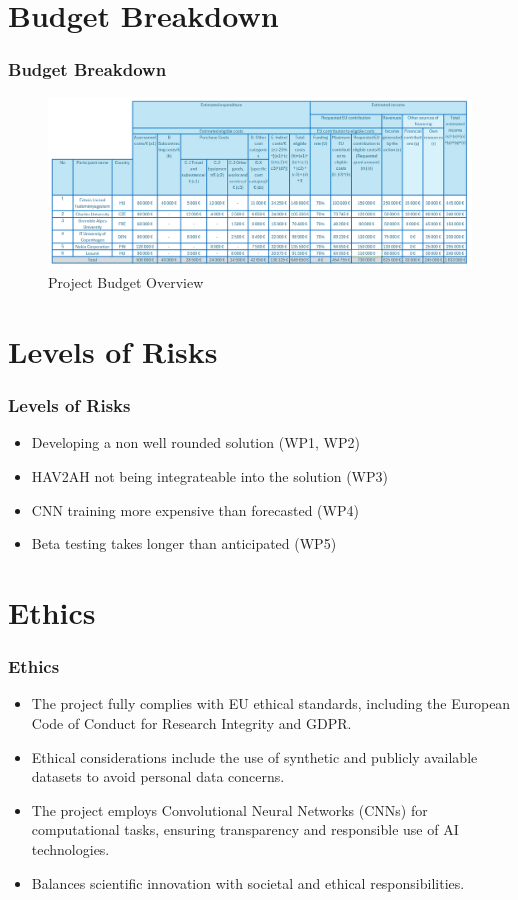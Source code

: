 \documentclass{beamer}
\begin{document}
\section{Budget Breakdown}
\begin{frame}
\frametitle{Budget Breakdown}

\begin{figure}[htbp]
    \centering
    \includegraphics[width=1\textwidth]{images/budget.png}
    \caption{Project Budget Overview}
    \label{fig:budget}
\end{figure}

\end{frame}

\section{Levels of Risks}
\begin{frame}
\frametitle{Levels of Risks}

\begin{itemize}
    \item Developing a non well rounded solution (WP1, WP2)
    \item HAV2AH not being integrateable into the solution (WP3)
    \item CNN training more expensive than forecasted (WP4)
    \item Beta testing takes longer than anticipated (WP5)
\end{itemize}

\end{frame}

\section{Ethics}
\begin{frame}
\frametitle{Ethics}
\begin{itemize}
    \item The project fully complies with EU ethical standards, including the European Code of Conduct for Research Integrity and GDPR.
    \item Ethical considerations include the use of synthetic and publicly available datasets to avoid personal data concerns.
    \item The project employs Convolutional Neural Networks (CNNs) for computational tasks, ensuring transparency and responsible use of AI technologies.
    \item Balances scientific innovation with societal and ethical responsibilities.
\end{itemize}
\end{frame}
\end{document}
